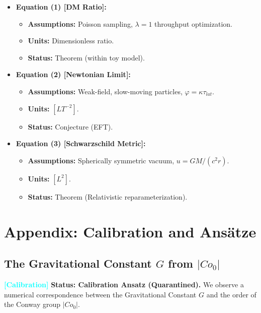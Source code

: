 \documentclass[11pt,titlepage]{article}
\newcommand{\tagcal}{\textcolor{cyan}{\textbf{[Calibration]}} }
\begin{document}
\begin{itemize}
    
\item \textbf{Equation (1) [DM Ratio]:} 
        \begin{itemize}
            
\item \textbf{Assumptions:} Poisson sampling, $\lambda=1$ throughput optimization.
            
\item \textbf{Units:} Dimensionless ratio.
            
\item \textbf{Status:} Theorem (within toy model).
        \end{itemize}
    
\item \textbf{Equation (2) [Newtonian Limit]:}
        \begin{itemize}
            
\item \textbf{Assumptions:} Weak-field, slow-moving particles, $\varphi = \kappa  \tau_{lat}$.
            
\item \textbf{Units:} $[L T^{-2}]$.
            
\item \textbf{Status:} Conjecture (EFT).
        \end{itemize}
    
\item \textbf{Equation (3) [Schwarzschild Metric]:}
        \begin{itemize}
            
\item \textbf{Assumptions:} Spherically symmetric vacuum, $u = GM/(c^2 r)$.
            
\item \textbf{Units:} $[L^2]$.
            
\item \textbf{Status:} Theorem (Relativistic reparameterization).
        \end{itemize}
\end{itemize}

\section{Appendix: Calibration and Ansätze}
\label{sec:calibration}

\subsection{The Gravitational Constant $G$ from $|Co_0|$}
\tagcal \textbf{Status: Calibration Ansatz (Quarantined).} 
We observe a numerical correspondence between the Gravitational Constant $G$ and the order of the Conway group $|Co_0|$. 
\end{document}
